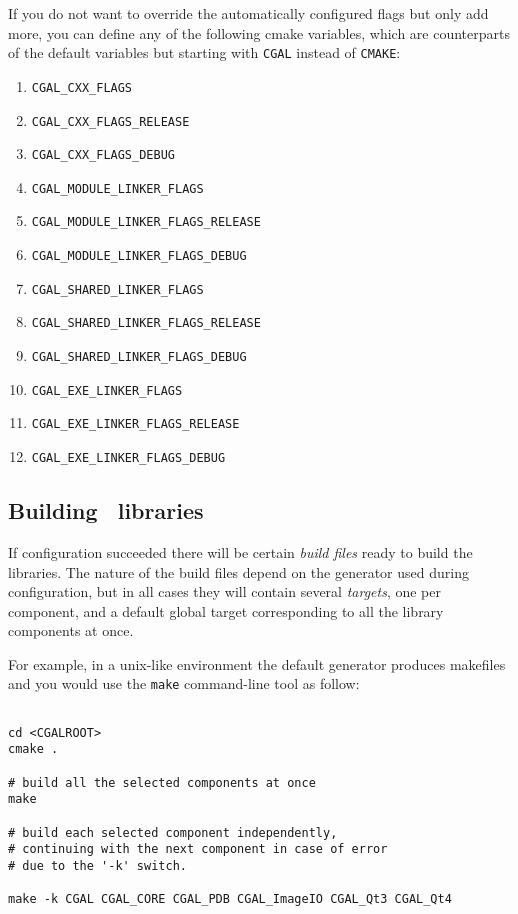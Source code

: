 If you do not want to override the automatically configured flags but only add more, you can 
define any of the following cmake variables, which are counterparts of the default
variables but starting with {\tt CGAL} instead of {\tt CMAKE}:

\begin{enumerate}
\item {\tt CGAL\_CXX\_FLAGS}
\item {\tt CGAL\_CXX\_FLAGS\_RELEASE}
\item {\tt CGAL\_CXX\_FLAGS\_DEBUG}
\item {\tt CGAL\_MODULE\_LINKER\_FLAGS}
\item {\tt CGAL\_MODULE\_LINKER\_FLAGS\_RELEASE}
\item {\tt CGAL\_MODULE\_LINKER\_FLAGS\_DEBUG}
\item {\tt CGAL\_SHARED\_LINKER\_FLAGS}
\item {\tt CGAL\_SHARED\_LINKER\_FLAGS\_RELEASE}
\item {\tt CGAL\_SHARED\_LINKER\_FLAGS\_DEBUG}
\item {\tt CGAL\_EXE\_LINKER\_FLAGS}
\item {\tt CGAL\_EXE\_LINKER\_FLAGS\_RELEASE}
\item {\tt CGAL\_EXE\_LINKER\_FLAGS\_DEBUG}
\end{enumerate}


\subsection{Building \cgal\ libraries}

If configuration succeeded there will be certain {\em build files} ready to build the libraries.
The nature of the build files depend on the generator used during configuration, but in all cases they 
will contain several {\em targets}, one per component,  and a default global target corresponding 
to all the library components at once.

For example, in a unix-like environment the default generator produces makefiles and you would
use the {\tt make} command-line tool as follow:

{\ccTexHtml{\scriptsize}{}
\begin{verbatim}

cd <CGALROOT>
cmake .

# build all the selected components at once
make 

# build each selected component independently,
# continuing with the next component in case of error
# due to the '-k' switch.

make -k CGAL CGAL_CORE CGAL_PDB CGAL_ImageIO CGAL_Qt3 CGAL_Qt4

\end{verbatim}
}

